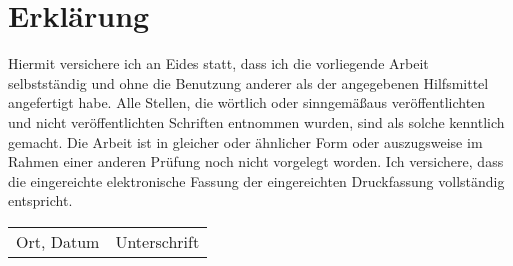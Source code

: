 \thispagestyle{empty}
\chapter*{Erkl\"arung}
\noindent
Hiermit versichere ich an Eides statt, dass ich die vorliegende Arbeit selbstst\"andig und ohne die Benutzung anderer als der angegebenen Hilfsmittel angefertigt habe. Alle Stellen, die w\"ortlich oder sinngem\"a\ss   aus ver\"offentlichten und nicht ver\"offentlichten Schriften entnommen wurden, sind als solche kenntlich gemacht. Die Arbeit ist in gleicher oder \"ahnlicher Form oder auszugsweise im Rahmen einer anderen Pr\"ufung noch nicht vorgelegt worden. Ich versichere, dass die eingereichte elektronische Fassung der eingereichten Druckfassung vollst\"andig entspricht.
\begin{tabular}{p{5cm} p{7cm}}
\vspace{4cm}\\
\hline
Ort, Datum & Unterschrift
\end{tabular}
